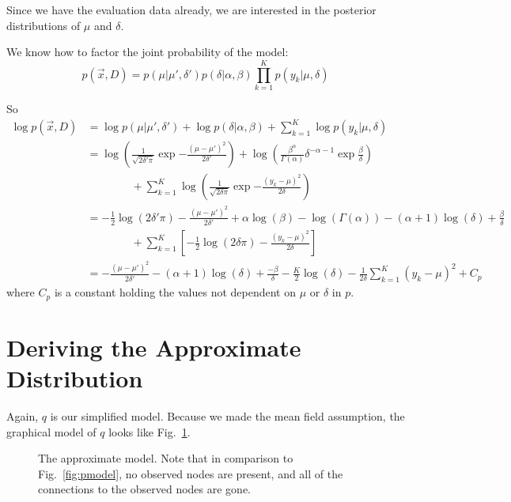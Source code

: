 \documentclass[12pt]{article}
\begin{document}
Since we have the evaluation data already, we are interested in the posterior
distributions of $\mu$ and $\delta$.

We know how to factor the joint probability of the model:
\begin{equation}
    p(\vec{x}, D) = p(\mu|\mu', \delta')p(\delta|\alpha, \beta)\prod_{k=1}^{K}p(y_{k}|\mu, \delta)
\end{equation}

So
\begin{align}
    \log{p(\vec{x}, D)} &= \log{p(\mu|\mu', \delta')} + \log{p(\delta|\alpha,
    \beta)} + \sum_{k=1}^{K}
    \log{p(y_{k}|\mu, \delta)} \nonumber \\
    &=
    \log{\left(\frac{1}{\sqrt{2\delta'\pi}}\exp{-\frac{(\mu-\mu')^{2}}{2\delta'}}\right)} +
    \log{\left(\frac{\beta^{\alpha}}{\Gamma(\alpha)}\delta^{-\alpha-1}\exp{\frac{\beta}{\delta}}\right)}
    \nonumber \\
    &\quad\quad\quad\quad+ \sum_{k=1}^{K}
    \log{\left(\frac{1}{\sqrt{2\delta\pi}}\exp{-\frac{(y_{k}-\mu)^{2}}{2\delta}}\right)}
    \nonumber \\
    &= -\frac{1}{2} \log{(2\delta'\pi)} - \frac{(\mu - \mu')^{2}}{2\delta'} +
    \alpha \log{(\beta)} - \log{(\Gamma(\alpha))} - (\alpha + 1) \log{(\delta)}
    + \frac{\beta}{\delta}\nonumber \\
    &\quad\quad\quad\quad+ \sum_{k=1}^{K} \left[-\frac{1}{2}
    \log{(2\delta\pi)} - \frac{(y_{k} - \mu)^{2}}{2\delta}\right] \nonumber \\
    &= -\frac{(\mu-\mu')^{2}}{2\delta'} - (\alpha+1)\log{(\delta)} +
    \frac{-\beta}{\delta} - \frac{K}{2}\log{(\delta)} -
    \frac{1}{2\delta}\sum_{k=1}^{K} (y_{k}-\mu)^{2} + C_p
    \label{eq:logp}
\end{align}
where $C_p$ is a constant holding the values not dependent on $\mu$ or $\delta$
in $p$.

\section{Deriving the Approximate Distribution}

Again, $q$ is our simplified model.  Because we made the mean field assumption,
the graphical model of $q$ looks like Fig.~\ref{fig:qmodel}.

\begin{figure}[h]
    \centering
{}
    \caption{The approximate model.  Note that in comparison to
    Fig.~\ref{fig:pmodel}, no observed nodes are present, and all of the
    connections to the observed nodes are gone.}
    \label{fig:qmodel}
\end{figure}
\end{document}
